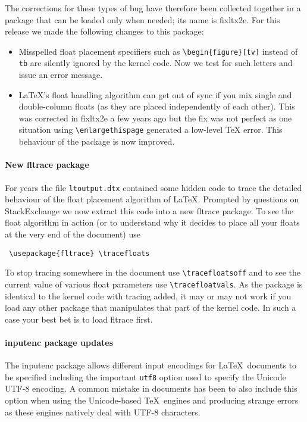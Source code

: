 \documentclass{ltnews}
\begin{document}
The corrections for these types of bug have therefore been collected together
in a package that can be loaded only when needed; its name is \textsf{fixltx2e}.
For this release we made the following changes to this package:
\begin{itemize}
\item
   Misspelled float placement specifiers such as
   \verb=\begin{figure}[tv]= instead of \texttt{tb} are silently
   ignored by the kernel code.  Now we test for such letters and issue
   an error message.
\item
   \LaTeX's float handling algorithm can get out of sync if you mix
   single and double-column floats (as they are placed independently
   of each other). This was corrected in \textsf{fixltx2e} a few years ago
   but the fix was not perfect as one situation using
   \verb=\enlargethispage= generated a low-level \TeX{} error. 
   This behaviour of the package is now improved.
\end{itemize}




\paragraph{New \textsf{fltrace} package}

For years the file \texttt{ltoutput.dtx} contained some hidden code to
trace the detailed behaviour of the float placement algorithm of
\LaTeX. Prompted by questions on StackExchange we now extract this
code into a new \textsf{fltrace} package. To see the float algorithm
in action (or to understand why it decides to place all your floats at
the very end of the document) use
\begin{verbatim}
 \usepackage{fltrace} \tracefloats
\end{verbatim}
To stop tracing somewhere in the document use
\verb=\tracefloatsoff= and to see the current value of various float
parameters use \verb=\tracefloatvals=. As the package is identical to
the kernel code with tracing added, it may or may not work if you load any
other package that manipulates that part of the kernel code. In such a
case your best bet is to load \textsf{fltrace} first.

\paragraph{\textsf{inputenc} package updates}

The \textsf{inputenc} package allows different input encodings for
\LaTeX\ documents to be specified including the important
\texttt{utf8} option used to specify the Unicode UTF-8 encoding. A
common mistake in documents has been to also include this option when
using the Unicode-based \TeX\ engines  and 
producing strange errors as these engines natively deal with UTF-8
characters.
\end{document}
